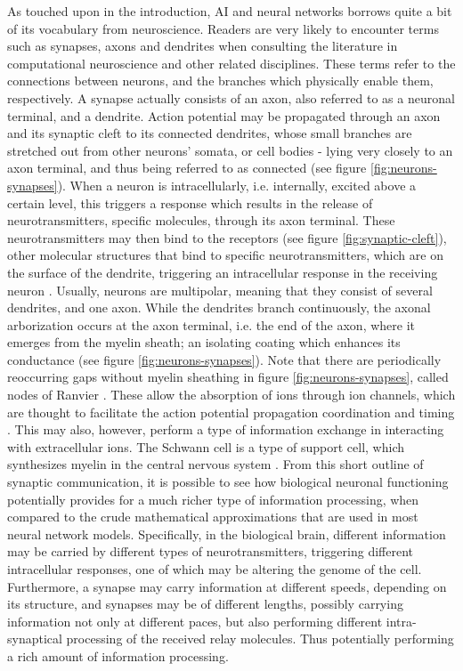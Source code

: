 As touched upon in the introduction, AI and neural networks borrows quite a bit of its vocabulary from neuroscience. Readers are very likely to encounter terms such as synapses, axons and dendrites when consulting the literature in computational neuroscience and other related disciplines. These terms refer to the connections between neurons, and the branches which physically enable them, respectively. A synapse actually consists of an axon, also referred to as a neuronal terminal, and a dendrite. Action potential may be propagated through an axon and its synaptic cleft to its connected dendrites, whose small branches are stretched out from other neurons' somata, or cell bodies - lying very closely to an axon terminal, and thus being referred to as connected (see figure \ref{fig:neurons-synapses}). When a neuron is intracellularly, i.e. internally, excited above a certain level, this triggers a response which results in the release of neurotransmitters, specific molecules, through its axon terminal. These neurotransmitters may then bind to the receptors (see figure \ref{fig:synaptic-cleft}), other molecular structures that bind to specific neurotransmitters, which are on the surface of the dendrite, triggering an intracellular response in the receiving neuron \citep{Campbell2015chpt9}.
Usually, neurons are multipolar, meaning that they consist of several dendrites, and one axon. While the dendrites branch continuously, the axonal arborization occurs at the axon terminal, i.e. the end of the axon, where it emerges from the myelin sheath; an isolating coating which enhances its conductance (see figure \ref{fig:neurons-synapses}). Note that there are periodically reoccurring gaps without myelin sheathing in figure \ref{fig:neurons-synapses}, called nodes of Ranvier \citep{Byrne2014chpt1p11}. These allow the absorption of ions through ion channels, which are thought to facilitate the action potential propagation coordination and timing \citep{Byrne2014chpt2p26}. This may also, however, perform a type of information exchange in interacting with extracellular ions. The Schwann cell is a type of support cell, which synthesizes myelin in the central nervous system \citep{Byrne2014chpt1p11}.
From this short outline of synaptic communication, it is possible to see how biological neuronal functioning potentially provides for a much richer type of information processing, when compared to the crude mathematical approximations that are used in most neural network models. Specifically, in the biological brain, different information may be carried by different types of neurotransmitters, triggering different intracellular responses, one of which may be altering the genome of the cell. Furthermore, a synapse may carry information at different speeds, depending on its structure, and synapses may be of different lengths, possibly carrying information not only at different paces, but also performing different intra-synaptical processing of the received relay molecules. Thus potentially performing a rich amount of information processing.

